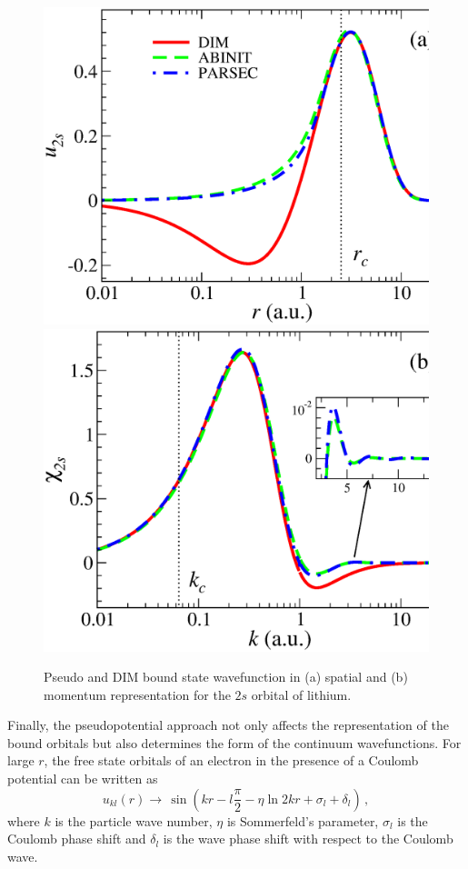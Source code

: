 \documentclass[10pt]{article}
\begin{document}
\begin{figure}[H]
\centering
 \includegraphics[height=0.23\textheight]{figures/pseudopot/funcLi.eps}
\hspace{0.2cm}
 \includegraphics[height=0.23\textheight]{figures/pseudopot/funckLi.eps}
 \caption{Pseudo and DIM bound state wavefunction in (a) spatial
 and (b) momentum representation for the
 $2s$ orbital of lithium.}
 \label{fig:wavesLi}
\end{figure}

Finally, the pseudopotential approach not only affects the 
representation of the bound orbitals but also determines the form of 
the continuum wavefunctions. For large $r$, the free state orbitals of 
an electron in the presence of a Coulomb potential can be written as
\begin{equation}
 u_{kl}(r) \rightarrow \,\sin \left( kr - l\frac{\pi}{2} - \eta \ln 2kr +
 \sigma_l + \delta_l \right)\,,
\end{equation}
where $k$ is the particle wave number, $\eta$ is Sommerfeld's 
parameter, $\sigma_l$ is the Coulomb phase shift and $\delta_l$ is the 
wave phase shift with respect to the Coulomb wave.
\end{document}
